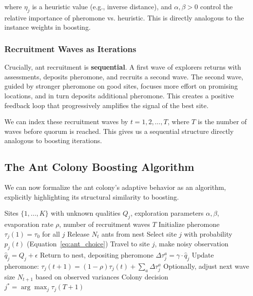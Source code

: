 \documentclass[12pt,letterpaper]{article}
\begin{document}
where $\eta_j$ is a heuristic value (e.g., inverse distance), and $\alpha, \beta > 0$ control the relative importance of pheromone vs. heuristic. This is directly analogous to the instance weights in boosting.

\subsubsection{Recruitment Waves as Iterations}

Crucially, ant recruitment is \textbf{sequential}. A first wave of explorers returns with assessments, deposits pheromone, and recruits a second wave. The second wave, guided by stronger pheromone on good sites, focuses more effort on promising locations, and in turn deposits additional pheromone. This creates a positive feedback loop that progressively amplifies the signal of the best site.

We can index these recruitment waves by $t = 1,2,\dots,T$, where $T$ is the number of waves before quorum is reached. This gives us a sequential structure directly analogous to boosting iterations.

\subsection{The Ant Colony Boosting Algorithm}

We can now formalize the ant colony's adaptive behavior as an algorithm, explicitly highlighting its structural similarity to boosting.

\begin{algorithm}[H]
\caption{Ant Colony Adaptive Recruitment (ACAR)}
\label{alg:acar}
\begin{algorithmic}[1]
\REQUIRE Sites $\{1,\dots,K\}$ with unknown qualities $Q_j$, exploration parameters $\alpha, \beta$, evaporation rate $\rho$, number of recruitment waves $T$
\STATE Initialize pheromone $\tau_j(1) = \tau_0$ for all $j$
    \STATE Release $N_t$ ants from nest
        \STATE Select site $j$ with probability $p_j(t)$ (Equation~\ref{eq:ant_choice})
        \STATE Travel to site $j$, make noisy observation $\hat{q}_j = Q_j + \epsilon$
        \STATE Return to nest, depositing pheromone $\Delta \tau_j^a = \gamma \cdot \hat{q}_j$
    \ENDFOR
    \STATE Update pheromone: $\tau_j(t+1) = (1-\rho)\tau_j(t) + \sum_{a} \Delta \tau_j^a$
    \STATE Optionally, adjust next wave size $N_{t+1}$ based on observed variances
\ENDFOR
\RETURN Colony decision $j^* = \arg\max_j \tau_j(T+1)$
\end{algorithmic}
\end{algorithm}
\end{document}
